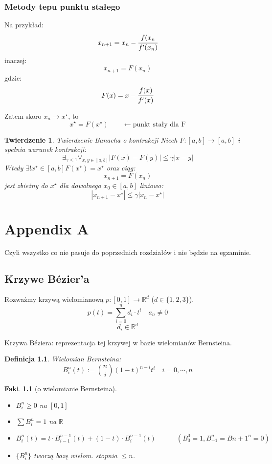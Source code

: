 \documentclass[hidelinks,a4paper,fleqn,oneside]{book}
\newcommand{\RR}{\mathbb{R}}
\newcommand{\ra}{\rightarrow}
\newcommand{\la}{\leftarrow}
\newtheorem{defi}{Definicja}
\newtheorem{fakt}{Fakt}
\newtheorem{twierdz}{Twierdzenie}
\begin{document}
\subsection{Metody tepu punktu stałego}

Na przykład:
\[
	x_{n+1} = x_n - \cfrac{f(x_n}{f'(x_n)}
\]
inaczej:
\[
	x_{n+1} = F(x_n)
\]
gdzie:
\[
	F(x) = x - \cfrac{f(x)}{f'(x)}
\]

Zatem skoro $x_n \longrightarrow x^\star$, to
\[
	x^\star = F(x^\star)\quad \quad \la \textrm{punkt stały dla F}
\]
\begin{twierdz}{Twierdzenie Banacha o kontrakcji}
	Niech $F: [a, b] \ra [a, b]$ i spełnia warunek kontrakcji:
	\[
		\exists_{\gamma < 1} \forall_{x, y \in [a, b]} |F(x) - F(y)| \leq \gamma |x-y|
	\]
	Wtedy $\exists! x^\star \in [a, b] F(x^\star) = x^\star$
	oraz ciąg:
	\[
		x_{n+1} = F(x_n)
	\]
	jest zbieżny do $x^\star$ dla dowolnego $x_0 \in [a, b]$ liniowo:
	\[
		|x_{n+1} - x^\star| \leq \gamma|x_n - x^\star|
	\]
\end{twierdz}

\chapter{Appendix A}
Czyli wszystko co nie pasuje do poprzednich rozdziałów i nie będzie na egzaminie.
\section{Krzywe Bézier'a}
	Rozważmy krzywą wielomianową $p: [0, 1] \ra \RR^d$ ($d \in \{1, 2, 3\}$).
	\[
		p(t) = \sum_{i=0}^n d_i \cdot t^i \quad a_n \neq 0
	\]
	\[
		d_i \in \RR^d
	\]

Krzywa Béziera: reprezentacja tej krzywej w bazie wielomianów Bernsteina.
\begin{defi}
	 Wielomian Bernsteina:
	 \[
	 	B_i^n(t) := \binom{n}{i} (1-t)^{n-i} t^i \quad i=0, \cdots, n
 	\]
\end{defi}

\begin{fakt}[o wielomianie Bernsteina]

	\begin{itemize}	
		\item $B_i^n \geq 0$ na $[0, 1]$
		\item $\sum B_i^n = 1$ na $\RR$
		\item $B_i^n(t) = t\cdot B_{i-1}^{n-1}(t) + (1-t) \cdot B_i^{n-1}(t) \quad \quad \quad (B_0^0 = 1, B_{-1}^n = B{n+1}^n = 0)$
		\item $\{B_i^n\}$ tworzą bazę wielom. stopnia $\leq n$.
	\end{itemize}
\end{fakt}
\end{document}
